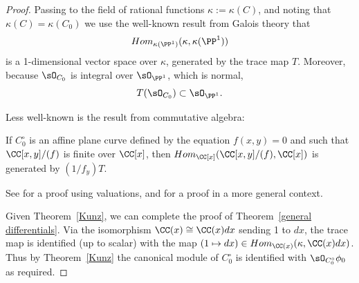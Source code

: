 \begin{proof}
Passing to the field of rational functions $\kappa := \kappa(C)$, and noting that
$\kappa(C) = \kappa(C_{0}) $ we use the well-known result from Galois theory that 
$$
Hom_{\kappa(\PP^{1})}(\kappa, \kappa(\PP^{1}))
$$
is a 1-dimensional vector space over $\kappa$, generated by the trace map $T$. Moreover, 
because $\sO_{C_{0}}$ is integral over $\sO_{\PP^{1}}$, which is normal,
$$
T(\sO_{C_{0}})\subset \sO_{\PP^{1}}.
$$

%
%

Less well-known is the result from commutative
algebra:

\begin{theorem}\label{Kunz}
If $C_{0}^{\circ}$ is an affine plane curve defined by the
equation $f(x,y)=0$ and such that $\CC[x,y]/(f)$ is finite over $\CC[x]$,
then $Hom_{\CC[x]}(\CC[x,y]/(f), \CC[x])$ is generated by $(1/f_{y})T$.
\end{theorem}

See \cite[Theorem 15.1]{Kunz} for a proof using valuations, and \cite[Theorem A.1]{MR4026452} for a proof in
a more general context.

Given Theorem~\ref{Kunz}, we can complete the proof of Theorem~\ref{general differentials}. Via the isomorphism $\CC(x) \cong \CC(x)dx$ sending 1 to $dx$, the trace map is identified (up to scalar)
with the map $(1\mapsto dx) \in Hom_{\CC(x)}(\kappa, \CC(x)dx)$. Thus by Theorem~\ref{Kunz}
the canonical module of $C_{0}^{\circ}$ is identified with $\sO_{C_{0}^\circ} \phi_{0}$ as
required.
\end{proof}

